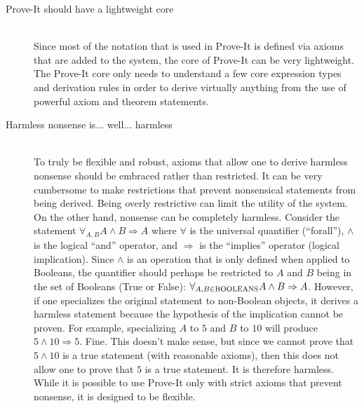 \documentclass{article}[12pt]
\begin{document}
\begin{description}
\item[Prove-It should have a lightweight core] \hfill \\
  Since most of the notation that is used in Prove-It is defined via axioms that are added to the system, the core of Prove-It can be very lightweight.  The Prove-It core only needs to understand a few core expression types and derivation rules in order to derive virtually anything from the use of powerful axiom and theorem statements.
\item[Harmless nonsense is... well... harmless] \hfill \\
  To truly be flexible and robust, axioms that allow one to derive harmless nonsense should be embraced rather than restricted.  It can be very cumbersome to make restrictions that prevent nonsensical statements from being derived.  Being overly restrictive can limit the utility of the system.  On the other hand, nonsense can be completely harmless.  Consider the statement
    $\forall_{A, B} A \land B \Rightarrow A$ where $\forall$ is the universal quantifier (“forall”), $\land$ is the logical “and” operator, and $\Rightarrow$ is the “implies” operator (logical implication).  Since $\land$ is an operation that is only defined when applied to Booleans, the quantifier should perhaps be restricted to $A$ and $B$ being in the set of Booleans (True or False):
    $\forall_{A, B \in {\rm BOOLEANS}} A \land B \Rightarrow A$.
 However, if one specializes the original statement to non-Boolean objects, it derives a harmless statement because the hypothesis of the implication cannot be proven.  For example, specializing $A$ to $5$ and $B$ to $10$ will produce $5 \land 10 \Rightarrow 5$.  Fine.  This doesn’t make sense, but since we cannot prove that $5 \land 10$ is a true statement (with reasonable axioms), then this does not allow one to prove that $5$ is a true statement.  It is therefore harmless.  While it is possible to use Prove-It only with strict axioms that prevent nonsense, it is designed to be flexible.
\end{description}
\end{document}
